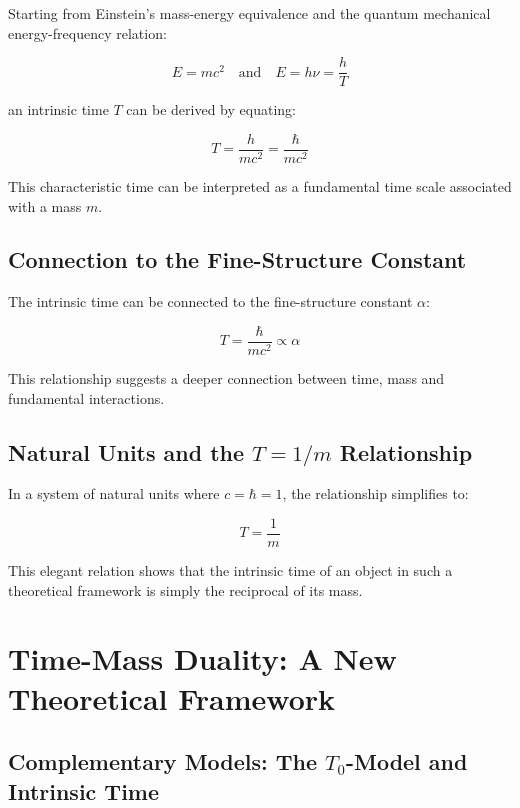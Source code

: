 \documentclass[12pt,a4paper]{article}  %
\begin{document}
	Starting from Einstein's mass-energy equivalence and the quantum mechanical energy-frequency relation:
	
	\begin{equation}
		E = mc^2 \quad \text{and} \quad E = h\nu = \frac{h}{T}
	\end{equation}
	
	an intrinsic time $T$ can be derived by equating:
	
	\begin{equation}
		T = \frac{h}{mc^2} = \frac{\hbar}{mc^2}
	\end{equation}
	
	This characteristic time can be interpreted as a fundamental time scale associated with a mass $m$.
	
	\subsection{Connection to the Fine-Structure Constant}
	
	The intrinsic time can be connected to the fine-structure constant $\alpha$:
	
	\begin{equation}
		T = \frac{\hbar}{mc^2} \propto \alpha
	\end{equation}
	
	This relationship suggests a deeper connection between time, mass and fundamental interactions.
	
	\subsection{Natural Units and the $T = 1/m$ Relationship}
	
	In a system of natural units where $c = \hbar = 1$, the relationship simplifies to:
	
	\begin{equation}
		T = \frac{1}{m}
	\end{equation}
	
	This elegant relation shows that the intrinsic time of an object in such a theoretical framework is simply the reciprocal of its mass.
	
	\section{Time-Mass Duality: A New Theoretical Framework}
	
	\subsection{Complementary Models: The $T_0$-Model and Intrinsic Time}
	
\end{document}
